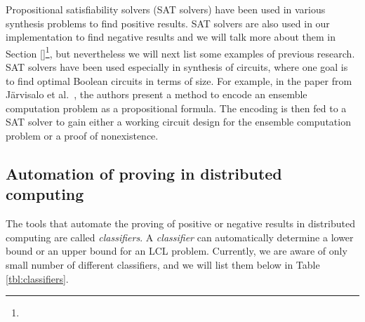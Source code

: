 Propositional satisfiability solvers (SAT solvers) have been used in various synthesis problems to find positive results.
SAT solvers are also used in our implementation to find negative results and we will talk more about them in Section \ref{}\footnote{}, but nevertheless we will next list some examples of previous research.
SAT solvers have been used especially in synthesis of circuits, where one goal is to find optimal Boolean circuits in terms of size.
For example, in the paper from Järvisalo et al.\ \cite{DBLP:conf/sat/JarvisaloKKK12}, the authors present a method to encode an ensemble computation problem as a propositional formula.
The encoding is then fed to a SAT solver to gain either a working circuit design for the ensemble computation problem or a proof of nonexistence.









%
%
%
\subsection{Automation of proving in distributed computing} \label{sec:prior_work:title_b}


The tools that automate the proving of positive or negative results in distributed computing are called \emph{classifiers}.
A \emph{classifier} can automatically determine a lower bound or an upper bound for an LCL problem.
Currently, we are aware of only small number of different classifiers, and we will list them below in Table \ref{tbl:classifiers}.



